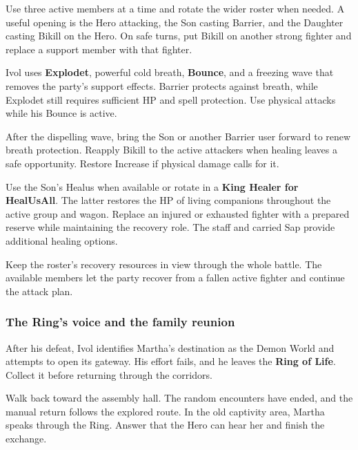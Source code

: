 
Use three active members at a time and rotate the wider
roster when needed. A useful opening is the Hero attacking,
the Son casting Barrier, and the Daughter casting Bikill
on the Hero. On safe turns, put Bikill on another strong
fighter and replace a support member with that fighter.

Ivol uses \textbf{Explodet}, powerful cold breath,
\textbf{Bounce}, and a freezing wave that removes the
party's support effects. Barrier protects against breath,
while Explodet still requires sufficient HP and spell
protection. Use physical attacks while his Bounce is active.

After the dispelling wave, bring the Son or another Barrier
user forward to renew breath protection. Reapply Bikill to
the active attackers when healing leaves a safe opportunity.
Restore Increase if physical damage calls for it.

Use the Son's Healus when available or rotate in a
\textbf{King Healer for HealUsAll}. The latter restores
the HP of living companions throughout the active group
and wagon. Replace an injured or exhausted fighter with
a prepared reserve while maintaining the recovery role.
The staff and carried Sap provide additional healing options.

Keep the roster's recovery resources in view through the
whole battle. The available members let the party recover
from a fallen active fighter and continue the attack plan.

\subsubsection*{The Ring's voice and the family reunion}

After his defeat, Ivol identifies Martha's destination
as the Demon World and attempts to open its gateway.
His effort fails, and he leaves the \textbf{Ring of Life}.
Collect it before returning through the corridors.


Walk back toward the assembly hall. The random encounters
have ended, and the manual return follows the explored route.
In the old captivity area, Martha speaks through the Ring.
Answer that the Hero can hear her and finish the exchange.


